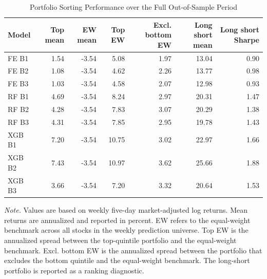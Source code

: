 \begin{table}[H]
\centering
\small
\caption{Portfolio Sorting Performance over the Full Out-of-Sample Period}
\label{tab:portfolio_sorting}
\begin{tabular}{lrrrrrr}
\toprule
Model & Top mean & EW mean & Top EW & Excl. bottom EW & Long short mean & Long short Sharpe \\
\midrule
FE B1 & 1.54 & -3.54 & 5.08 & 1.97 & 13.04 & 0.90 \\
FE B2 & 1.08 & -3.54 & 4.62 & 2.26 & 13.77 & 0.98 \\
FE B3 & 1.03 & -3.54 & 4.58 & 2.07 & 12.98 & 0.93 \\
RF B1 & 4.69 & -3.54 & 8.24 & 2.97 & 20.31 & 1.47 \\
RF B2 & 4.28 & -3.54 & 7.83 & 3.07 & 20.29 & 1.38 \\
RF B3 & 4.31 & -3.54 & 7.85 & 2.95 & 19.78 & 1.43 \\
XGB B1 & 7.20 & -3.54 & 10.75 & 3.02 & 22.97 & 1.66 \\
XGB B2 & 7.43 & -3.54 & 10.97 & 3.62 & 25.66 & 1.88 \\
XGB B3 & 3.66 & -3.54 & 7.20 & 3.32 & 20.64 & 1.53 \\
\bottomrule
\end{tabular}
\vspace{0.5em}
\begin{minipage}{0.95\textwidth}
\footnotesize
\textit{Note.} Values are based on weekly five-day market-adjusted log returns. Mean returns are annualized and reported in percent. EW refers to the equal-weight benchmark across all stocks in the weekly prediction universe. Top EW is the annualized spread between the top-quintile portfolio and the equal-weight benchmark. Excl. bottom EW is the annualized spread between the portfolio that excludes the bottom quintile and the equal-weight benchmark. The long-short portfolio is reported as a ranking diagnostic.
\end{minipage}
\end{table}